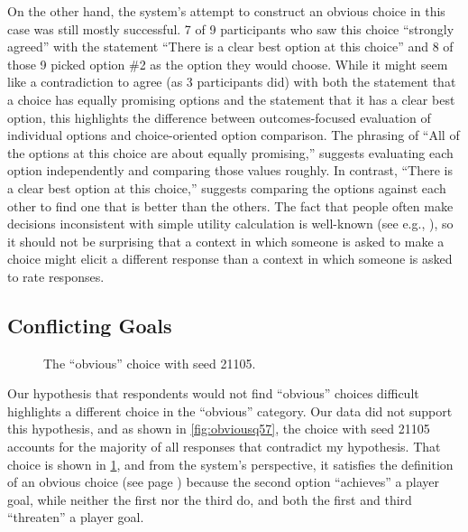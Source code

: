 On the other hand, the system's attempt to construct an obvious choice in this case was still mostly successful.
%
7 of 9 participants who saw this choice ``strongly agreed'' with the statement ``There is a clear best option at this choice'' and 8 of those 9 picked option \#2 as the option they would choose.
%
While it might seem like a contradiction to agree (as 3 participants did) with both the statement that a choice has equally promising options and the statement that it has a clear best option, this highlights the difference between outcomes-focused evaluation of individual options and choice-oriented option comparison.
%
The phrasing of ``All of the options at this choice are about equally promising,'' suggests evaluating each option independently and comparing those values roughly.
%
In contrast, ``There is a clear best option at this choice,'' suggests comparing the options against each other to find one that is better than the others.
%
The fact that people often make decisions inconsistent with simple utility calculation is well-known (see e.g., \citep{Tversky1993}), so it should not be surprising that a context in which someone is asked to make a choice might elicit a different response than a context in which someone is asked to rate responses.


\subsection{Conflicting Goals}


\begin{figure}[!h]
\centering
{}
  \caption{The ``obvious'' choice with seed 21105.}
  \label{fig:ch21105}
\end{figure}


Our hypothesis that respondents would not find ``obvious'' choices difficult highlights a different choice in the ``obvious'' category.
%
Our data did not support this hypothesis, and as shown in \cref{fig:obviousq57}, the choice with seed 21105 accounts for the majority of all responses that contradict my hypothesis.
%
That choice is shown in \cref{fig:ch21105}, and from the system's perspective, it satisfies the definition of an obvious choice (see page \pageref{page:choicetypes}) because the second option ``achieves'' a player goal, while neither the first nor the third do, and both the first and third ``threaten'' a player goal.


